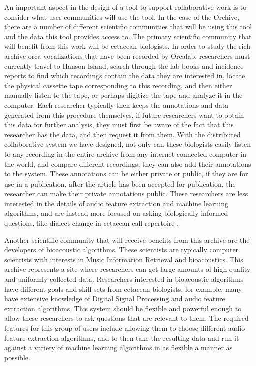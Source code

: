 \documentclass[12pt,oneside]{book}
\begin{document}
An important aspect in the design of a tool to support collaborative
work is to consider what user communities will use the tool.  In the
case of the Orchive, there are a number of different scientific
communities that will be using this tool and the data this tool
provides access to.  The primary scientific community that will
benefit from this work will be cetacean biologists.  In order to study
the rich archive orca vocalizations that have been recorded by
Orcalab, researchers must currently travel to Hanson Island, search
through the lab books and incidence reports to find which recordings
contain the data they are interested in, locate the physical cassette
tape corresponding to this recording, and then either manually listen
to the tape, or perhaps digitize the tape and analyze it in the
computer.  Each researcher typically then keeps the annotations and
data generated from this procedure themselves, if future researchers
want to obtain this data for further analysis, they must first be
aware of the fact that this researcher has the data, and then request
it from them.  With the distributed collaborative system we have
designed, not only can these biologists easily listen to any recording
in the entire archive from any internet connected computer in the
world, and compare different recordings, they can also add their
annotations to the system.  These annotations can be either private or
public, if they are for use in a publication, after the article has
been accepted for publication, the researcher can make their private
annotations public.  These researchers are less interested in the
details of audio feature extraction and machine learning algorithms,
and are instead more focused on asking biologically informed
questions, like dialect change in cetacean call repertoire
\cite{deecke00}.

Another scientific community that will receive benefits from this
archive are the developers of bioacoustic algorithms.  These
scientists are typically computer scientists with interests in Music
Information Retrieval and bioacoustics.  This archive represents a
site where researchers can get large amounts of high quality and
uniformly collected data.  Researchers interested in bioacoustic
algorithms have different goals and skill sets from cetacean
biologists, for example, many have extensive knowledge of Digital
Signal Processing and audio feature extraction algorithms.  This
system should be flexible and powerful enough to allow these
researchers to ask questions that are relevant to them.  The required
features for this group of users include allowing them to choose
different audio feature extraction algorithms, and to then take the
resulting data and run it against a variety of machine learning
algorithms in as flexible a manner as possible.
\end{document}
